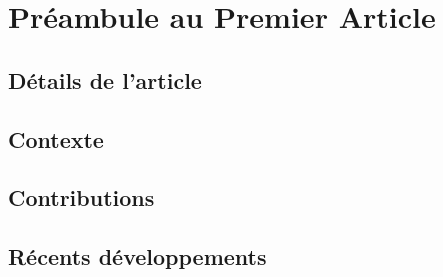 \chapter{Pr\'{e}ambule au Premier Article }

\section{D\'{e}tails de l'article}

\section{Contexte}

\section{Contributions}

\section{R\'{e}cents d\'{e}veloppements}

